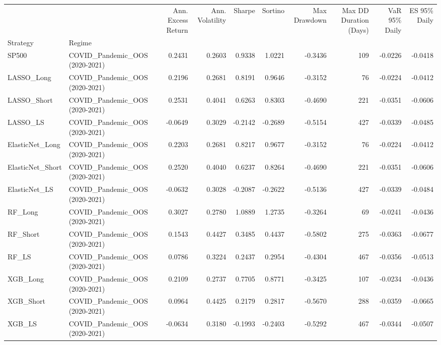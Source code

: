 \begin{tabular}{llrrrrrrrr}
\toprule
 &  & Ann. Excess Return & Ann. Volatility & Sharpe & Sortino & Max Drawdown & Max DD Duration (Days) & VaR 95\% Daily & ES 95\% Daily \\
Strategy & Regime &  &  &  &  &  &  &  &  \\
\midrule
SP500 & COVID\_Pandemic\_OOS (2020-2021) & 0.2431 & 0.2603 & 0.9338 & 1.0221 & -0.3436 & 109 & -0.0226 & -0.0418 \\
\cline{1-10}
LASSO\_Long & COVID\_Pandemic\_OOS (2020-2021) & 0.2196 & 0.2681 & 0.8191 & 0.9646 & -0.3152 & 76 & -0.0224 & -0.0412 \\
\cline{1-10}
LASSO\_Short & COVID\_Pandemic\_OOS (2020-2021) & 0.2531 & 0.4041 & 0.6263 & 0.8303 & -0.4690 & 221 & -0.0351 & -0.0606 \\
\cline{1-10}
LASSO\_LS & COVID\_Pandemic\_OOS (2020-2021) & -0.0649 & 0.3029 & -0.2142 & -0.2689 & -0.5154 & 427 & -0.0339 & -0.0485 \\
\cline{1-10}
ElasticNet\_Long & COVID\_Pandemic\_OOS (2020-2021) & 0.2203 & 0.2681 & 0.8217 & 0.9677 & -0.3152 & 76 & -0.0224 & -0.0412 \\
\cline{1-10}
ElasticNet\_Short & COVID\_Pandemic\_OOS (2020-2021) & 0.2520 & 0.4040 & 0.6237 & 0.8264 & -0.4690 & 221 & -0.0351 & -0.0606 \\
\cline{1-10}
ElasticNet\_LS & COVID\_Pandemic\_OOS (2020-2021) & -0.0632 & 0.3028 & -0.2087 & -0.2622 & -0.5136 & 427 & -0.0339 & -0.0484 \\
\cline{1-10}
RF\_Long & COVID\_Pandemic\_OOS (2020-2021) & 0.3027 & 0.2780 & 1.0889 & 1.2735 & -0.3264 & 69 & -0.0241 & -0.0436 \\
\cline{1-10}
RF\_Short & COVID\_Pandemic\_OOS (2020-2021) & 0.1543 & 0.4427 & 0.3485 & 0.4437 & -0.5802 & 275 & -0.0363 & -0.0677 \\
\cline{1-10}
RF\_LS & COVID\_Pandemic\_OOS (2020-2021) & 0.0786 & 0.3224 & 0.2437 & 0.2954 & -0.4304 & 467 & -0.0356 & -0.0513 \\
\cline{1-10}
XGB\_Long & COVID\_Pandemic\_OOS (2020-2021) & 0.2109 & 0.2737 & 0.7705 & 0.8771 & -0.3425 & 107 & -0.0234 & -0.0436 \\
\cline{1-10}
XGB\_Short & COVID\_Pandemic\_OOS (2020-2021) & 0.0964 & 0.4425 & 0.2179 & 0.2817 & -0.5670 & 288 & -0.0359 & -0.0665 \\
\cline{1-10}
XGB\_LS & COVID\_Pandemic\_OOS (2020-2021) & -0.0634 & 0.3180 & -0.1993 & -0.2403 & -0.5292 & 467 & -0.0344 & -0.0507 \\

\end{tabular}
